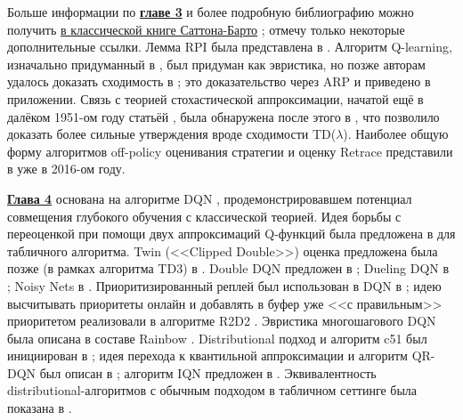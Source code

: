 Больше информации по \underline{\textbf{главе 3}} и более подробную библиографию можно получить \href{https://drive.google.com/file/d/1Z4W_-0IaMNpZnhnMkqcDVM_EA79GFJo-/view}{в классической книге Саттона-Барто} \cite{sutton2018reinforcement}; отмечу только некоторые дополнительные ссылки. Лемма RPI была представлена в \cite{kakade2002approximately}. Алгоритм Q-learning, изначально придуманный в \cite{watkins1989learning}, был придуман как эвристика, но позже авторам удалось доказать сходимость в \cite{watkins1992q}; это доказательство через ARP и приведено в приложении. Связь с теорией стохастической аппроксимации, начатой ещё в далёком 1951-ом году статьёй \cite{robbins1951stochastic}, была обнаружена после этого в \cite{tsitsiklis1994asynchronous}, что позволило доказать более сильные утверждения вроде сходимости TD($\lambda$). Наиболее общую форму алгоритмов off-policy оценивания стратегии и оценку Retrace представили в \cite{munos2016safe} уже в 2016-ом году.

\underline{\textbf{Глава 4}} основана на алгоритме DQN \cite{mnih2013playing}, продемонстрировавшем потенциал совмещения глубокого обучения с классической теорией. Идея борьбы с переоценкой при помощи двух аппроксимаций Q-функций была предложена в \cite{hasselt2010double} для табличного алгоритма. Twin (<<Clipped Double>>) оценка предложена была позже (в рамках алгоритма TD3) в \cite{fujimoto2018addressing}. Double DQN предложен в \cite{van2016deep}; Dueling DQN в \cite{wang2015dueling}; Noisy Nets в \cite{fortunato2017noisy}. Приоритизированный реплей был использован в DQN в \cite{schaul2015prioritized}; идею высчитывать приоритеты онлайн и добавлять в буфер уже <<с правильным>> приоритетом реализовали в алгоритме R2D2 \cite{horgan2018distributed}. Эвристика многошагового DQN была описана в составе Rainbow \cite{hessel2018rainbow}. Distributional подход и алгоритм c51 был инициирован в \cite{bellemare2017distributional}; идея перехода к квантильной аппроксимации и алгоритм QR-DQN был описан в \cite{dabney2018distributional}; алгоритм IQN предложен в \cite{dabney2018implicit}. Эквивалентность distributional-алгоритмов с обычным подходом в табличном сеттинге была показана в \cite{lyle2019comparative}.

